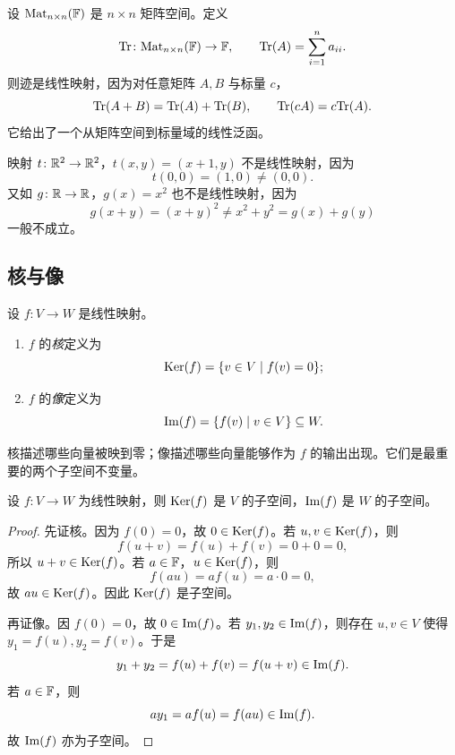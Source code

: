 \begin{example}[迹映射]
设 $\mathrm{Mat}_{n\times n}(\mathbb{F})$ 是 $n\times n$ 矩阵空间。定义
\[
  \mathrm{Tr}\colon \mathrm{Mat}_{n\times n}(\mathbb{F})\to \mathbb{F},
  \qquad
  \mathrm{Tr}(A)=\sum_{i=1}^n a_{ii}.
\]
则迹是线性映射，因为对任意矩阵 $A,B$ 与标量 $c$，
\[
  \mathrm{Tr}(A+B)=\mathrm{Tr}(A)+\mathrm{Tr}(B),\qquad \mathrm{Tr}(cA)=c\mathrm{Tr}(A).
\]
它给出了一个从矩阵空间到标量域的线性泛函。
\end{example}

\begin{example}[不是线性映射的例子]
映射 $t\colon \mathbb{R}^2\to\mathbb{R}^2$，$t(x,y)=(x+1,y)$ 不是线性映射，因为
\[
  t(0,0)=(1,0)\neq (0,0).
\]
又如 $g\colon \mathbb{R}\to\mathbb{R}$，$g(x)=x^2$ 也不是线性映射，因为
\[
  g(x+y)=(x+y)^2\neq x^2+y^2=g(x)+g(y)
\]
一般不成立。
\end{example}

\subsection{核与像}

\begin{definition}
设 $f\colon V\to W$ 是线性映射。
\begin{enumerate}[label=\textnormal{(\arabic*)}]
  \item $f$ 的\emph{核}定义为
  \[
    \mathrm{Ker}(f)=\{v\in V\mid f(v)=0\};
  \]
  \item $f$ 的\emph{像}定义为
  \[
    \mathrm{Im}(f)=\{f(v)\mid v\in V\}\subseteq W.
  \]
\end{enumerate}
\end{definition}

核描述哪些向量被映到零；像描述哪些向量能够作为 $f$ 的输出出现。它们是最重要的两个子空间不变量。

\begin{proposition}
设 $f\colon V\to W$ 为线性映射，则 $\mathrm{Ker}(f)$ 是 $V$ 的子空间，$\mathrm{Im}(f)$ 是 $W$ 的子空间。
\end{proposition}

\begin{proof}
先证核。因为 $f(0)=0$，故 $0\in\mathrm{Ker}(f)$。若 $u,v\in\mathrm{Ker}(f)$，则
\[
  f(u+v)=f(u)+f(v)=0+0=0,
\]
所以 $u+v\in\mathrm{Ker}(f)$。若 $a\in\mathbb{F}$，$u\in\mathrm{Ker}(f)$，则
\[
  f(au)=af(u)=a\cdot 0=0,
\]
故 $au\in\mathrm{Ker}(f)$。因此 $\mathrm{Ker}(f)$ 是子空间。

再证像。因 $f(0)=0$，故 $0\in\mathrm{Im}(f)$。若 $y_1,y_2\in\mathrm{Im}(f)$，则存在 $u,v\in V$ 使得 $y_1=f(u),y_2=f(v)$。于是
\[
  y_1+y_2=f(u)+f(v)=f(u+v)\in\mathrm{Im}(f).
\]
若 $a\in\mathbb{F}$，则
\[
  ay_1=af(u)=f(au)\in\mathrm{Im}(f).
\]
故 $\mathrm{Im}(f)$ 亦为子空间。
\end{proof}

